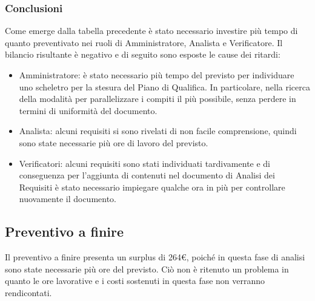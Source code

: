\subsubsection{Conclusioni}
Come emerge dalla tabella precedente è stato necessario investire più tempo di quanto preventivato
nei ruoli di Amministratore, Analista e Verificatore.
Il bilancio risultante è negativo e di seguito sono esposte le cause dei ritardi:
\begin{itemize}
	\item Amministratore: è stato necessario più tempo del previsto per individuare uno scheletro per la stesura del Piano di Qualifica. In particolare,
	nella ricerca della modalità per parallelizzare i compiti il più possibile, senza perdere in termini di uniformità del documento.
	\item Analista: alcuni requisiti si sono rivelati di non facile comprensione, quindi sono state necessarie 
	più ore di lavoro del previsto.
	\item Verificatori: alcuni requisiti sono stati individuati tardivamente e di conseguenza per
	l’aggiunta di contenuti nel documento di Analisi dei Requisiti è stato necessario impiegare
	qualche ora in più per controllare nuovamente il documento.
\end{itemize}
\subsection{Preventivo a finire}
Il preventivo a finire presenta un surplus di 264\euro, poiché in questa fase di analisi sono state necessarie più ore del previsto.
Ciò non è ritenuto un problema in quanto le ore lavorative e i costi sostenuti in questa fase non verranno rendicontati.